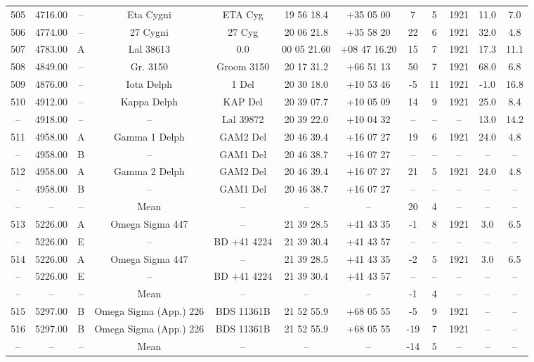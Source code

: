 \begin{table}
\begin{tabular}{cccccccccccc}
505 & 4716.00 & -- & Eta Cygni & ETA Cyg & 19 56 18.4 & +35 05 00 & 7 & 5 & 1921 & 11.0 & 7.0 \\
506 & 4774.00 & -- & 27 Cygni & 27 Cyg & 20 06 21.8 & +35 58 20 & 22 & 6 & 1921 & 32.0 & 4.8 \\
507 & 4783.00 & A & Lal 38613 & 0.0 & 00 05 21.60 & +08 47 16.20 & 15 & 7 & 1921 & 17.3 & 11.1 \\
508 & 4849.00 & -- & Gr. 3150 & Groom 3150 & 20 17 31.2 & +66 51 13 & 50 & 7 & 1921 & 68.0 & 6.8 \\
509 & 4876.00 & -- & Iota Delph & 1 Del & 20 30 18.0 & +10 53 46 & -5 & 11 & 1921 & -1.0 & 16.8 \\
510 & 4912.00 & -- & Kappa Delph & KAP Del & 20 39 07.7 & +10 05 09 & 14 & 9 & 1921 & 25.0 & 8.4 \\
-- & 4918.00 & -- & -- & Lal 39872 & 20 39 22.0 & +10 04 32 & -- & -- & -- & 13.0 & 14.2 \\
511 & 4958.00 & A & Gamma 1 Delph & GAM2 Del & 20 46 39.4 & +16 07 27 & 19 & 6 & 1921 & 24.0 & 4.8 \\
-- & 4958.00 & B & -- & GAM1 Del & 20 46 38.7 & +16 07 27 & -- & -- & -- & -- & -- \\
512 & 4958.00 & A & Gamma 2 Delph & GAM2 Del & 20 46 39.4 & +16 07 27 & 21 & 5 & 1921 & 24.0 & 4.8 \\
-- & 4958.00 & B & -- & GAM1 Del & 20 46 38.7 & +16 07 27 & -- & -- & -- & -- & -- \\
-- & -- & -- & Mean & -- & -- & -- & 20 & 4 & -- & -- & -- \\
513 & 5226.00 & A & Omega Sigma 447 & -- & 21 39 28.5 & +41 43 35 & -1 & 8 & 1921 & 3.0 & 6.5 \\
-- & 5226.00 & E & -- & BD +41 4224 & 21 39 30.4 & +41 43 57 & -- & -- & -- & -- & -- \\
514 & 5226.00 & A & Omega Sigma 447 & -- & 21 39 28.5 & +41 43 35 & -2 & 5 & 1921 & 3.0 & 6.5 \\
-- & 5226.00 & E & -- & BD +41 4224 & 21 39 30.4 & +41 43 57 & -- & -- & -- & -- & -- \\
-- & -- & -- & Mean & -- & -- & -- & -1 & 4 & -- & -- & -- \\
515 & 5297.00 & B & Omega Sigma (App.) 226 & BDS 11361B & 21 52 55.9 & +68 05 55 & -5 & 9 & 1921 & -- & -- \\
516 & 5297.00 & B & Omega Sigma (App.) 226 & BDS 11361B & 21 52 55.9 & +68 05 55 & -19 & 7 & 1921 & -- & -- \\
-- & -- & -- & Mean & -- & -- & -- & -14 & 5 & -- & -- & -- \\

\end{tabular}
\end{table}
